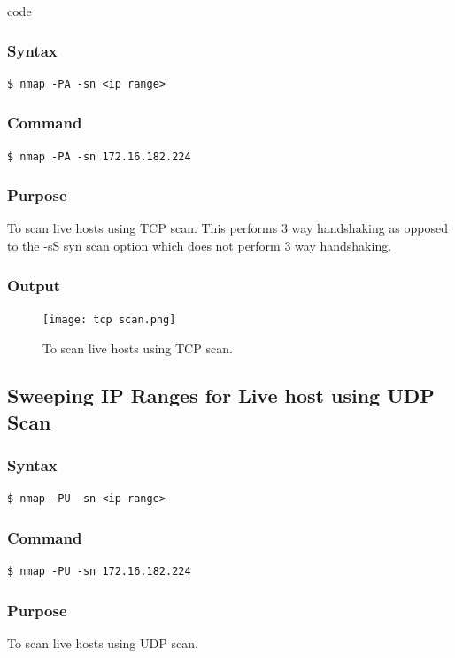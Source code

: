 code \documentclass[11pt]{article}
\begin{document}
\subsubsection{Syntax}
\begin{verbatim}
$ nmap -PA -sn <ip range>
\end{verbatim}

\subsubsection*{Command}
\begin{verbatim}
$ nmap -PA -sn 172.16.182.224
\end{verbatim}

\subsubsection*{Purpose}
To scan live hosts using TCP scan. This performs 3 way handshaking as opposed to the -sS syn scan option which does not perform 3 way handshaking.

\subsubsection*{Output}
\begin{figure}[H]
    \centering
    \texttt{[image: tcp scan.png]}
    \caption{To scan live hosts using TCP scan.}
    \label{fig:1}
\end{figure}


\subsection{Sweeping IP Ranges for Live host using UDP Scan}

\subsubsection{Syntax}
\begin{verbatim}
$ nmap -PU -sn <ip range>
\end{verbatim}

\subsubsection*{Command}
\begin{verbatim}
$ nmap -PU -sn 172.16.182.224
\end{verbatim}

\subsubsection*{Purpose}
To scan live hosts using UDP scan.
\end{document}
